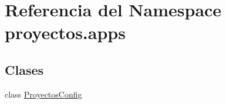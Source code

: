 \hypertarget{namespaceproyectos_1_1apps}{}\section{Referencia del Namespace proyectos.\+apps}
\label{namespaceproyectos_1_1apps}
\subsection*{Clases}
\begin{DoxyCompactItemize}
\item 
class \hyperlink{classproyectos_1_1apps_1_1_proyectos_config}{Proyectos\+Config}
\end{DoxyCompactItemize}
